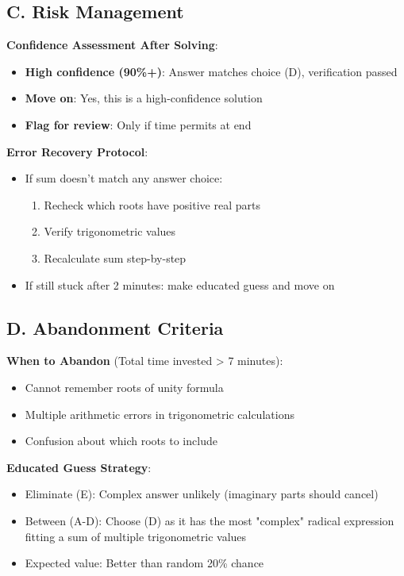 \documentclass[11pt]{article}
\begin{document}
\begin{competitionbox}
\subsection*{C. Risk Management}

\textbf{Confidence Assessment After Solving}:
\begin{itemize}[leftmargin=*]
    \item \textbf{High confidence (90\%+)}: Answer matches choice (D), verification passed
    \item \textbf{Move on}: Yes, this is a high-confidence solution
    \item \textbf{Flag for review}: Only if time permits at end
\end{itemize}

\textbf{Error Recovery Protocol}:
\begin{itemize}[leftmargin=*]
    \item If sum doesn't match any answer choice:
    \begin{enumerate}
        \item Recheck which roots have positive real parts
        \item Verify trigonometric values
        \item Recalculate sum step-by-step
    \end{enumerate}
    \item If still stuck after 2 minutes: make educated guess and move on
\end{itemize}

\subsection*{D. Abandonment Criteria}

\textbf{When to Abandon} (Total time invested > 7 minutes):
\begin{itemize}[leftmargin=*]
    \item Cannot remember roots of unity formula
    \item Multiple arithmetic errors in trigonometric calculations
    \item Confusion about which roots to include
\end{itemize}

\textbf{Educated Guess Strategy}:
\begin{itemize}[leftmargin=*]
    \item Eliminate (E): Complex answer unlikely (imaginary parts should cancel)
    \item Between (A-D): Choose (D) as it has the most "complex" radical expression fitting a sum of multiple trigonometric values
    \item Expected value: Better than random 20\% chance
\end{itemize}

\end{competitionbox}
\end{document}
